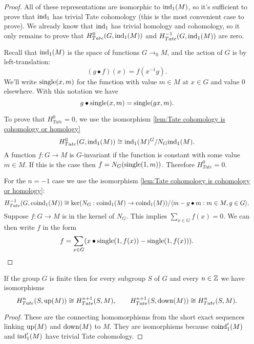 \begin{proof}
	All of these representations are isomorphic to $\mathrm{ind}_1(M)$, so it's
	sufficient to prove that $\mathrm{ind}_1$ has trivial Tate cohomology
	(this is the most convenient case to prove).
	We already know that $\mathrm{ind}_1$ has trivial homology and cohomology, so it
	only remains to prove that $H^0_{Tate}(G,\mathrm{ind}_1(M))$ and $H^{-1}_{Tate}(G,\mathrm{ind}_1(M))$ are zero.

	Recall that $\mathrm{ind}_1(M)$ is the space of functions $G \to_0 M$, and the action of $G$ is by
	left-translation:
	\[
		(g \bullet f) (x) = f (x^{-1}g).
	\]
	We'll write $\mathrm{single}(x,m)$ for the function with value $m\in M$ at $x \in G$ and value $0$
	elsewhere. With this notation we have
	\[
		g \bullet \mathrm{single}(x,m) = \mathrm{single}(gx,m).
	\]

	To prove that $H^0_{Tate}=0$, we use the isomorphism
	\ref{lem:Tate cohomology is cohomology or homology}
	\[
		H^0_{Tate}(G,\mathrm{ind}_1(M)) \cong \mathrm{ind}_1(M)^G / N_G \mathrm{ind}_1(M).
	\]
	A function $f : G \to M$ is $G$-invariant if the function is constant with some value $m \in M$.
	If this is the case then $f = N_G (\mathrm{single}(1,m))$. Therefore $H^0_{Tate} = 0$.

	For the $n=-1$ case we use the isomorphism \ref{lem:Tate cohomology is cohomology or homology}:
	\[
		H^{-1}_{Tate}(G,\mathrm{coind}_1(M))
		\cong
		\ker(N_G : \mathrm{coind}_1(M) \to \mathrm{coind}_1(M)) / \langle m - g \bullet m : m \in M, g \in G \rangle.
	\]
	Suppose $f:G \to M$ is in the kernel of $N_G$.
	This implies $\sum_{x \in G} f(x) = 0$.
	We can then write $f$ in the form
	\[
		f = \sum_{x \in G} (x \bullet \mathrm{single}(1,f(x)) - \mathrm{single}(1,f(x))).
	\]
\end{proof}


\begin{corollary}	\label{cor:Tate up down isos}
	\leanok
	If the group $G$ is finite then for every subgroup $S$ of $G$
	and every $n \in {\mathbb Z}$ we have isomorphisms
	\[
		H^n_{Tate}(S, \mathrm{up}(M)) \cong H^{n+1}_{Tate}(S,M),
		\qquad
		H^{n+1}_{Tate}(S, \mathrm{down}(M)) \cong H^{n}_{Tate}(S,M).
	\]
\end{corollary}

\begin{proof}
	These are the connecting homomorphisms from the
	short exact sequences linking $\mathrm{up}(M)$ and $\mathrm{down}(M)$ to $M$.
	They are isomorphisms because $\mathrm{coind}_1'(M)$ and $\mathrm{ind}_1'(M)$ have trivial Tate cohomology.
\end{proof}


